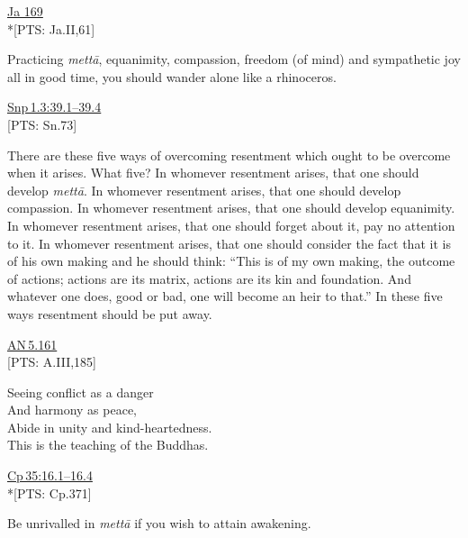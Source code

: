 \documentclass[10pt, openright]{book}
\begin{document}
\begin{flushright}
\href{https://suttacentral.net/ja169/en/rouse}{Ja 169}\\

*[PTS: Ja.II,61]


\end{flushright}
Practicing \textit{mettā}, equanimity, compassion, freedom (of mind) and sympathetic joy all in good time, you should wander alone like a rhinoceros.


\begin{flushright}
\href{https://suttacentral.net/snp1.3/en/sujato\#39.1}{Snp 1.3:39.1–39.4}\\

[PTS: Sn.73]


\end{flushright}
There are these five ways of overcoming resentment which ought to be overcome when it arises. What five? In whomever resentment arises, that one should develop \textit{mettā}. In whomever resentment arises, that one should develop compassion. In whomever resentment arises, that one should develop equanimity. In whomever resentment arises, that one should forget about it, pay no attention to it. In whomever resentment arises, that one should consider the fact that it is of his own making and he should think: “This is of my own making, the outcome of actions; actions are its matrix, actions are its kin and foundation. And whatever one does, good or bad, one will become an heir to that.” In these five ways resentment should be put away.


\begin{flushright}
\href{https://suttacentral.net/an5.161/en/sujato}{AN 5.161}\\

[PTS: A.III,185]


\end{flushright}


\begin{itemize}


Seeing conflict as a danger \\ 
And harmony as peace, \\ 
Abide in unity and kind-heartedness. \\ 
This is the teaching of the Buddhas.


\end{itemize}
\begin{flushright}
\href{https://suttacentral.net/cp35/en/sujato\#16.1}{Cp 35:16.1–16.4}\\

*[PTS: Cp.371]


\end{flushright}
Be unrivalled in \textit{mettā} if you wish to attain awakening.
\end{document}
